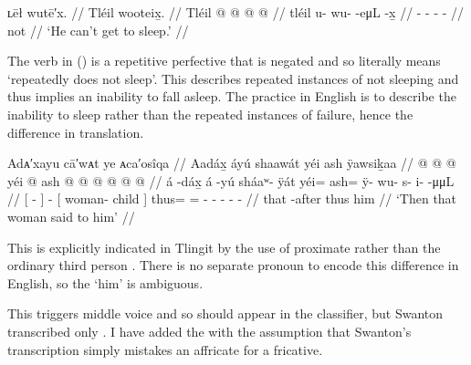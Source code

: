 \ex\label{ex:100-76-cant-sleep}%
%
\begingl
	\glpreamble	ʟēł wutē′x. //
	\glpreamble	Tléil wooteix̱. //
	\gla	Tléil  @ {} @ {} @ {} @ {} //
	\glb	tléil u- wu-  -eμL -x̱ //
	\glc	{} - -  - - //
	\gld	not  {} {} {} {} //
	\glft	‘He can’t get to sleep.’
		//
\endgl
\xe

The verb in (\lastx) is a repetitive perfective that is negated and so literally means ‘repeatedly does not sleep’.
This describes repeated instances of not sleeping and thus implies an inability to fall asleep.
The practice in English is to describe the inability to sleep rather than the repeated instances of failure, hence the difference in translation.

\ex\label{ex:100-77-woman-tells-him}%
%
\begingl
	\glpreamble	Adᴀ′xayu cā′wᴀt ye ᴀca′osîqa //
	\glpreamble	Aadáx̱ áyú shaawát yéi ash ÿawsiḵaa //
	\gla	{}  @ {} {}  @ {} 
		{}  @ {} {}
		yéi @ ash @  @ {} @ {} @ {} @ {} @ {} //
	\glb	{} á -dáx̱ {} á -yú 
		{} sháaʷ- ÿát {} yéi= ash= ÿ- wu- s- i-  -μμL //
	\glc	{}[  - {}]  - 
		{}[ woman- child {}]
		thus= = - - - -  - //
	\gld	{} that -after {}  {} 
		{}  {} {}
		thus him  {} {} {} {} {} //
	\glft	‘Then that woman said to him’
		//
\endgl
\xe

This is explicitly indicated in Tlingit by the use of proximate  rather than the ordinary third person .
There is no separate pronoun to encode this difference in English, so the ‘him’ is ambiguous.

This triggers middle voice and so  should appear in the classifier, but Swanton transcribed only .
I have added the  with the assumption that Swanton’s transcription simply mistakes an affricate for a fricative.

